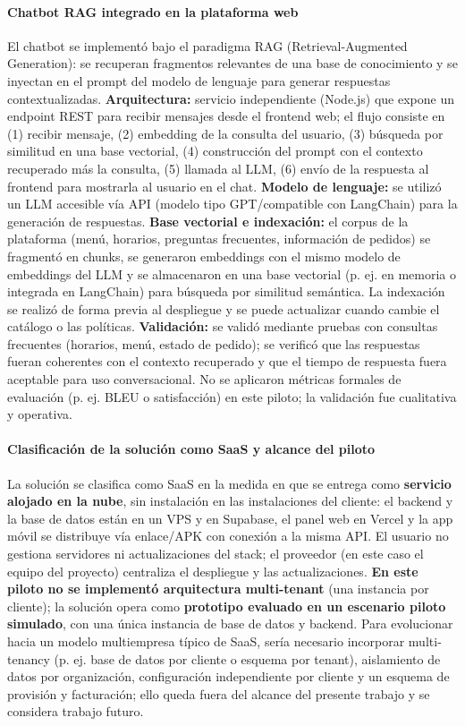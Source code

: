   \paragraph{Chatbot RAG integrado en la plataforma web}
  El chatbot se implementó bajo el paradigma RAG (Retrieval-Augmented Generation): se recuperan fragmentos relevantes de una base de conocimiento y se inyectan en el prompt del modelo de lenguaje para generar respuestas contextualizadas. \textbf{Arquitectura:} servicio independiente (Node.js) que expone un endpoint REST para recibir mensajes desde el frontend web; el flujo consiste en (1) recibir mensaje, (2) embedding de la consulta del usuario, (3) búsqueda por similitud en una base vectorial, (4) construcción del prompt con el contexto recuperado más la consulta, (5) llamada al LLM, (6) envío de la respuesta al frontend para mostrarla al usuario en el chat. \textbf{Modelo de lenguaje:} se utilizó un LLM accesible vía API (modelo tipo GPT/compatible con LangChain) para la generación de respuestas. \textbf{Base vectorial e indexación:} el corpus de la plataforma (menú, horarios, preguntas frecuentes, información de pedidos) se fragmentó en chunks, se generaron embeddings con el mismo modelo de embeddings del LLM y se almacenaron en una base vectorial (p. ej. en memoria o integrada en LangChain) para búsqueda por similitud semántica. La indexación se realizó de forma previa al despliegue y se puede actualizar cuando cambie el catálogo o las políticas. \textbf{Validación:} se validó mediante pruebas con consultas frecuentes (horarios, menú, estado de pedido); se verificó que las respuestas fueran coherentes con el contexto recuperado y que el tiempo de respuesta fuera aceptable para uso conversacional. No se aplicaron métricas formales de evaluación (p. ej. BLEU o satisfacción) en este piloto; la validación fue cualitativa y operativa.

  \paragraph{Clasificación de la solución como SaaS y alcance del piloto}
  La solución se clasifica como SaaS en la medida en que se entrega como \textbf{servicio alojado en la nube}, sin instalación en las instalaciones del cliente: el backend y la base de datos están en un VPS y en Supabase, el panel web en Vercel y la app móvil se distribuye vía enlace/APK con conexión a la misma API. El usuario no gestiona servidores ni actualizaciones del stack; el proveedor (en este caso el equipo del proyecto) centraliza el despliegue y las actualizaciones. \textbf{En este piloto no se implementó arquitectura multi-tenant} (una instancia por cliente); la solución opera como \textbf{prototipo evaluado en un escenario piloto simulado}, con una única instancia de base de datos y backend. Para evolucionar hacia un modelo multiempresa típico de SaaS, sería necesario incorporar multi-tenancy (p. ej. base de datos por cliente o esquema por tenant), aislamiento de datos por organización, configuración independiente por cliente y un esquema de provisión y facturación; ello queda fuera del alcance del presente trabajo y se considera trabajo futuro.

